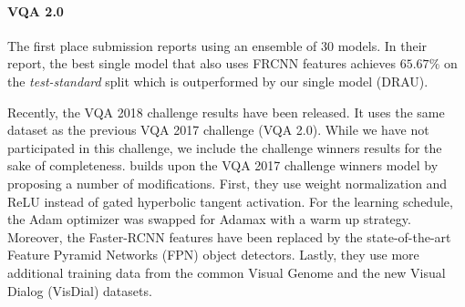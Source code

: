 \documentclass[times,twocolumn, final ,authoryear]{elsarticle}
\begin{document}
  \paragraph{VQA 2.0}
  
  The first place submission \cite{anderson2017} reports using an ensemble of 30 models. In their report, the best single model that also uses FRCNN features achieves $65.67\%$ on the \textit{test-standard} split which is outperformed by our single model (DRAU).
  
  Recently, the VQA 2018 challenge results have been released. It uses the same dataset as the previous VQA 2017 challenge (VQA 2.0). While we have not participated in this challenge, we include the challenge winners results \citep{jiang2018} for the sake of completeness. \citeauthor{jiang2018} builds upon the VQA 2017 challenge winners model by proposing a number of modifications. First, they use weight normalization and ReLU instead of gated hyperbolic tangent activation. For the learning schedule,  the Adam optimizer was swapped for Adamax with a warm up strategy. Moreover, the Faster-RCNN features have been replaced by the state-of-the-art Feature Pyramid Networks (FPN) object detectors. Lastly, they use more additional training data from the common Visual Genome and the new Visual Dialog (VisDial) datasets.
  
\end{document}
